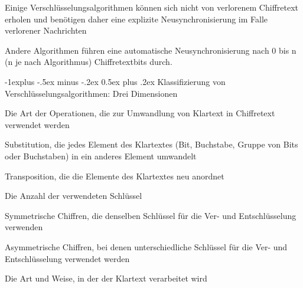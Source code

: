 \documentclass[a4paper]{article}
\makeatletter
\renewcommand{\subsection}{\@startsection{subsection}{2}{0mm}%
 {-1explus -.5ex minus -.2ex}%
 {0.5ex plus .2ex}%
 {\normalfont\normalsize\bfseries}}
\makeatother
\begin{document}
\begin{multicols}{3}
\begin{itemize*}
            \begin{itemize*}
                  \item Einige Verschlüsselungsalgorithmen können sich nicht von verlorenem Chiffretext erholen und benötigen daher eine explizite Neusynchronisierung im Falle verlorener Nachrichten
                  \item Andere Algorithmen führen eine automatische Neusynchronisierung nach 0 bis n (n je nach Algorithmus) Chiffretextbits durch.
            \end{itemize*}
      \end{itemize*}


      \subsection{Klassifizierung von Verschlüsselungsalgorithmen: Drei
            Dimensionen}

      \begin{itemize*}
            \item
            Die Art der Operationen, die zur Umwandlung von Klartext in
            Chiffretext verwendet werden

            \begin{itemize*}
                  \item Substitution, die jedes Element des Klartextes (Bit, Buchstabe, Gruppe von Bits oder Buchstaben) in ein anderes Element umwandelt
                  \item Transposition, die die Elemente des Klartextes neu anordnet
            \end{itemize*}
            \item
            Die Anzahl der verwendeten Schlüssel

            \begin{itemize*}
                  \item Symmetrische Chiffren, die denselben Schlüssel für die Ver- und Entschlüsselung verwenden
                  \item Asymmetrische Chiffren, bei denen unterschiedliche Schlüssel für die Ver- und Entschlüsselung verwendet werden
            \end{itemize*}
            \item
            Die Art und Weise, in der der Klartext verarbeitet wird


\end{itemize*}
\end{multicols}
\end{document}
